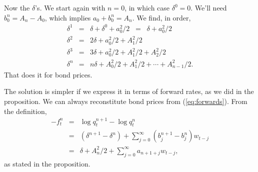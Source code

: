 \documentclass[11pt]{article}
\begin{document}
Now the $\delta$'s.
We start again with $n=0$, in which case $\delta^0 = 0$.
We'll need $b^n_0 = A_{n} - A_0 $,
which implies $a_0 + b^n_0 = A_n$.
We find, in order,
\begin{eqnarray*}
    \delta^1 &=& \delta + \delta^0 + a_0^2/2
            \;\;=\;\; \delta + a_0^2/2 \\
    \delta^2 &=& 2 \delta + a_0^2/2 + A_1^2/2 \\
    \delta^3 &=& 3 \delta + a_0^2/2 + A_1^2/2 + A_2^2/2\\
    \delta^n &=& n \delta + A_0^2/2 + A_1^2/2 + \cdots + A_{n-1}^2/2 .
\end{eqnarray*}
That does it for bond prices.

The solution is simpler if we express it in terms of forward rates,
as we did in the proposition.
We can always reconstitute bond prices from (\ref{eq:forwards}).
From the definition,
\begin{eqnarray*}
    - f^n_t &=& \log q^{n+1}_t - \log q^n_t \\
            &=& (\delta^{n+1} - \delta^n) + \sum_{j=0}^\infty
                    (b^{n+1}_j - b^n_j) w_{t-j} \\
            &=&  \delta + A_n^2/2 + \sum_{j=0}^\infty
                    a_{n+1+j} w_{t-j}  ,
\end{eqnarray*}
as stated in the proposition.
\end{document}
